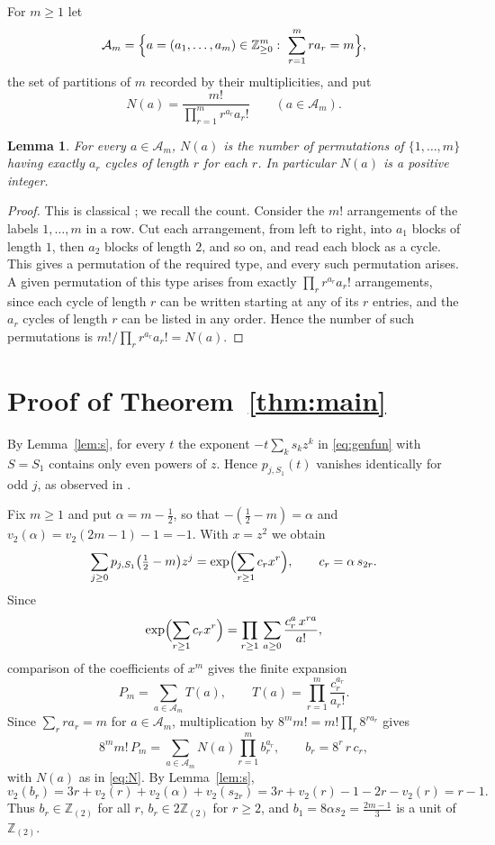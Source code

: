 \documentclass[11pt]{amsart}
\newtheorem{lemma}[theorem]{Lemma}
\theoremstyle{definition}
\theoremstyle{remark}
\numberwithin{equation}{section}
\newcommand{\Z}{\mathbb{Z}}
\newcommand{\Zt}{\Z_{(2)}}
\begin{document}
For $m\ge1$ let
\[
  \mathcal A_m=\Bigl\{a=(a_1,\dots,a_m)\in\Z_{\ge0}^m:\ \sum_{r=1}^m ra_r=m\Bigr\},
\]
the set of partitions of $m$ recorded by their multiplicities, and put
\begin{equation}\label{eq:N}
  N(a)=\frac{m!}{\prod_{r=1}^m r^{a_r}a_r!}\qquad(a\in\mathcal A_m).
\end{equation}

\begin{lemma}\label{lem:cycle}
For every $a\in\mathcal A_m$, $N(a)$ is the number of permutations of $\{1,\dots,m\}$ having exactly $a_r$ cycles of length $r$ for each $r$. In particular $N(a)$ is a positive integer.
\end{lemma}

\begin{proof}
This is classical \cite[26.4.7]{DLMF}; we recall the count. Consider the $m!$ arrangements of the labels $1,\dots,m$ in a row. Cut each arrangement, from left to right, into $a_1$ blocks of length $1$, then $a_2$ blocks of length $2$, and so on, and read each block as a cycle. This gives a permutation of the required type, and every such permutation arises. A given permutation of this type arises from exactly $\prod_r r^{a_r}a_r!$ arrangements, since each cycle of length $r$ can be written starting at any of its $r$ entries, and the $a_r$ cycles of length $r$ can be listed in any order. Hence the number of such permutations is $m!/\prod_r r^{a_r}a_r!=N(a)$.
\end{proof}

\section{Proof of Theorem~\ref{thm:main}}\label{sec:proof}

By Lemma~\ref{lem:s}, for every $t$ the exponent $-t\sum_ks_kz^k$ in \eqref{eq:genfun} with $S=S_1$ contains only even powers of $z$. Hence $p_{j,S_1}(t)$ vanishes identically for odd $j$, as observed in \cite[Lemma~2.2]{RS}.

Fix $m\ge1$ and put $\alpha=m-\frac12$, so that $-(\frac12-m)=\alpha$ and $v_2(\alpha)=v_2(2m-1)-1=-1$. With $x=z^2$ we obtain
\[
  \sum_{j\ge0}p_{j,S_1}\bigl(\tfrac12-m\bigr)z^j=\exp\Bigl(\sum_{r\ge1}c_rx^r\Bigr),
  \qquad c_r=\alpha\,s_{2r}.
\]
Since
\[
  \exp\Bigl(\sum_{r\ge1}c_rx^r\Bigr)=\prod_{r\ge1}\,\sum_{a\ge0}\frac{c_r^a\,x^{ra}}{a!},
\]
comparison of the coefficients of $x^m$ gives the finite expansion
\begin{equation}\label{eq:partition-sum}
  P_m=\sum_{a\in\mathcal A_m}T(a),\qquad T(a)=\prod_{r=1}^m\frac{c_r^{a_r}}{a_r!}.
\end{equation}
Since $\sum_rra_r=m$ for $a\in\mathcal A_m$, multiplication by $8^mm!=m!\prod_r8^{ra_r}$ gives
\begin{equation}\label{eq:normalized}
  8^mm!\,P_m=\sum_{a\in\mathcal A_m}N(a)\prod_{r=1}^mb_r^{a_r},
  \qquad b_r=8^r\,r\,c_r,
\end{equation}
with $N(a)$ as in \eqref{eq:N}. By Lemma~\ref{lem:s},
\[
  v_2(b_r)=3r+v_2(r)+v_2(\alpha)+v_2(s_{2r})=3r+v_2(r)-1-2r-v_2(r)=r-1 .
\]
Thus $b_r\in\Zt$ for all $r$, $b_r\in2\Zt$ for $r\ge2$, and $b_1=8\alpha s_2=\frac{2m-1}{3}$ is a unit of $\Zt$.
\end{document}
